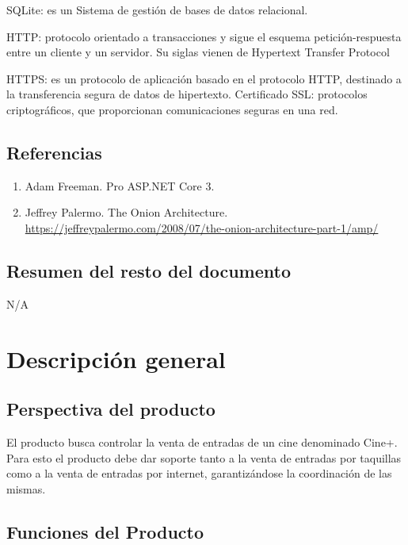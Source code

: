 \documentclass[letterpaper,12pt, oneside, onecolumn, openany]{book}
\begin{document}
SQLite: es un Sistema de gestión de bases de datos relacional.

HTTP: protocolo orientado a transacciones y sigue el esquema petición-respuesta entre un cliente y un servidor. Su siglas vienen de Hypertext Transfer Protocol

HTTPS: es un protocolo de aplicación basado en el protocolo HTTP, destinado a la transferencia segura de datos de hipertexto.
Certificado SSL: protocolos criptográficos, que proporcionan comunicaciones seguras en una red.

\section{Referencias}

\begin{enumerate}
	\item Adam Freeman. Pro ASP.NET Core 3.
	\item Jeffrey Palermo. The Onion Architecture. \href{https://jeffreypalermo.com/2008/07/the-onion-architecture-part-1/amp/}{https://jeffreypalermo.com/2008/07/the-onion-architecture-part-1/amp/} 
\end{enumerate}

\section{Resumen del resto del documento}

N/A

\chapter{Descripción general}

\section{Perspectiva del producto}

El producto busca controlar la venta de entradas de un cine denominado Cine+. Para esto el producto debe dar soporte tanto a la venta de entradas por taquillas como a la venta de entradas por internet, garantizándose la coordinación de las mismas.

\section{Funciones del Producto}
\end{document}
